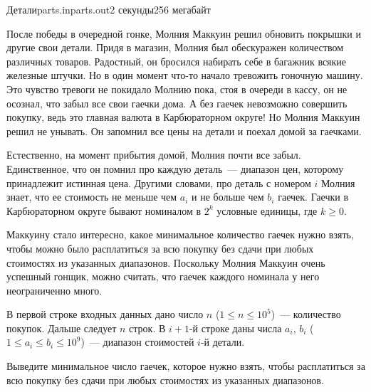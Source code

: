 \begin{problem}{Детали}{parts.in}{parts.out}{2 секунды}{256 мегабайт}
                                                                    
После победы в очередной гонке, Молния Маккуин решил обновить покрышки и другие свои детали. Придя в магазин, Молния был обескуражен
количеством различных товаров. Радостный, он бросился набирать себе в багажник всякие железные штучки. Но в один момент что-то начало тревожить
гоночную машину. Это чувство тревоги не покидало Молнию пока, стоя в очереди в кассу, он не осознал, что забыл все свои гаечки дома. 
А без гаечек невозможно совершить покупку, ведь это главная валюта в Карбюраторном округе! Но Молния Маккуин решил не унывать. Он запомнил все цены на детали и
поехал домой за гаечками. 

Естественно, на момент прибытия домой, Молния почти все забыл. Единственное, что он помнил про каждую деталь~--- диапазон цен, которому принадлежит истинная цена.
Другими словами, про деталь с номером $i$ Молния знает, что ее стоимость не меньше чем $a_i$ и не больше чем $b_i$ гаечек. 
Гаечки в Карбюраторном округе бывают номиналом в $2^k$ условные единицы, где $k \ge 0$.

Маккуину стало интересно, какое минимальное количество гаечек нужно взять, 
чтобы можно было расплатиться за всю покупку без сдачи при любых стоимостях из указанных диапазонов.
Поскольку Молния Маккуин очень успешный гонщик, можно считать, что гаечек каждого номинала у него неограниченно много.

\InputFile
В первой строке входных данных дано число $n$ ($1 \le n \le 10^5$)~--- количество покупок.
Дальше следует $n$ строк. В $i+1$-й строке даны числа $a_i$, $b_i$ ($1 \le a_i \le b_i \le 10^9$)~--- диапазон стоимостей $i$-й детали.

\OutputFile
Выведите минимальное число гаечек, которое нужно взять, чтобы расплатиться за всю покупку без сдачи при любых стоимостях из указанных диапазонов.

\Example
\begin{example}%
%
\end{example}

\end{problem}
